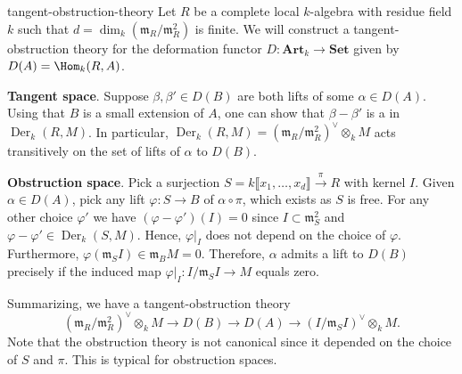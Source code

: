 \begin{example}{tangent-obstruction-theory}
    Let $R$ be a complete local $k$-algebra with residue field $k$ such that $d = \dim_k(\mathfrak{m}_R/\mathfrak{m}_R^2)$ is finite. We will construct a tangent-obstruction theory for the deformation functor $D : \textbf{Art}_k \to \textbf{Set}$ given by $D(A) = \Hom_k(R, A)$.

    \textbf{Tangent space}. Suppose $\beta, \beta' \in D(B)$ are both lifts of some $\alpha \in D(A)$. Using that $B$ is a small extension of $A$, one can show that $\beta - \beta'$ is a  in $\operatorname{Der}_k(R, M)$. In particular, $\operatorname{Der}_k(R, M) = (\mathfrak{m}_R/\mathfrak{m}_R^2)^\vee \otimes_k M$ acts transitively on the set of lifts of $\alpha$ to $D(B)$.

    \textbf{Obstruction space}. Pick a surjection $S = k\llbracket x_1, \ldots, x_d \rrbracket \xrightarrow{\pi} R$ with kernel $I$. Given $\alpha \in D(A)$, pick any lift $\varphi : S \to B$ of $\alpha \circ \pi$, which exists as $S$ is free. For any other choice $\varphi'$ we have $(\varphi - \varphi')(I) = 0$ since $I \subset \mathfrak{m}_S^2$ and $\varphi - \varphi' \in \operatorname{Der}_k(S, M)$. Hence, $\varphi|_I$ does not depend on the choice of $\varphi$. Furthermore, $\varphi(\mathfrak{m}_S I) \in \mathfrak{m}_B M = 0$. Therefore, $\alpha$ admits a lift to $D(B)$ precisely if the induced map $\varphi|_I : I / \mathfrak{m}_S I \to M$ equals zero.

    Summarizing, we have a tangent-obstruction theory
    \[ (\mathfrak{m}_R/\mathfrak{m}_R^2)^\vee \otimes_k M \to D(B) \to D(A) \to (I/\mathfrak{m}_S I)^\vee \otimes_k M . \]
    Note that the obstruction theory is not canonical since it depended on the choice of $S$ and $\pi$. This is typical for obstruction spaces.
\end{example}

